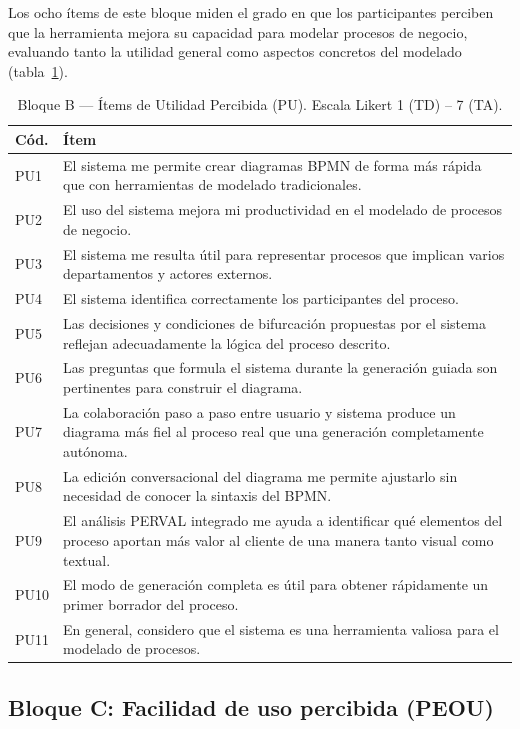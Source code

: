 Los ocho ítems de este bloque miden el grado en que los participantes perciben que la herramienta mejora su capacidad para modelar procesos de negocio, evaluando tanto la utilidad general como aspectos concretos del modelado (tabla~\ref{tab:pu}).

\begin{table}[H]
\centering
\caption{Bloque B --- Ítems de Utilidad Percibida (PU). Escala Likert 1 (TD) -- 7 (TA).}
\label{tab:pu}
\begin{tabular}{@{} p{0.8cm} p{12cm} @{}}
\hline
\rule{0pt}{10pt}\textbf{Cód.} & \textbf{Ítem} \\
\hline
\rule{0pt}{10pt}PU1 & El sistema me permite crear diagramas BPMN de forma más rápida que con herramientas de modelado tradicionales. \\[4pt]
PU2 & El uso del sistema mejora mi productividad en el modelado de procesos de negocio. \\[4pt]
PU3 & El sistema me resulta útil para representar procesos que implican varios departamentos y actores externos. \\[4pt]
PU4 & El sistema identifica correctamente los participantes del proceso. \\[4pt]
PU5 & Las decisiones y condiciones de bifurcación propuestas por el sistema reflejan adecuadamente la lógica del proceso descrito. \\[4pt]
PU6 & Las preguntas que formula el sistema durante la generación guiada son pertinentes para construir el diagrama. \\[4pt]
PU7 & La colaboración paso a paso entre usuario y sistema produce un diagrama más fiel al proceso real que una generación completamente autónoma. \\[4pt]
PU8 & La edición conversacional del diagrama me permite ajustarlo sin necesidad de conocer la sintaxis del BPMN. \\[4pt]
PU9 & El análisis PERVAL integrado me ayuda a identificar qué elementos del proceso aportan más valor al cliente de una manera tanto visual como textual. \\[4pt]
PU10 & El modo de generación completa es útil para obtener rápidamente un primer borrador del proceso. \\[4pt] 
PU11 & En general, considero que el sistema es una herramienta valiosa para el modelado de procesos. \\[4pt]
\hline
\end{tabular}
\end{table}

\subsection{Bloque C: Facilidad de uso percibida (PEOU)}
\label{subsec:bloqueC}

